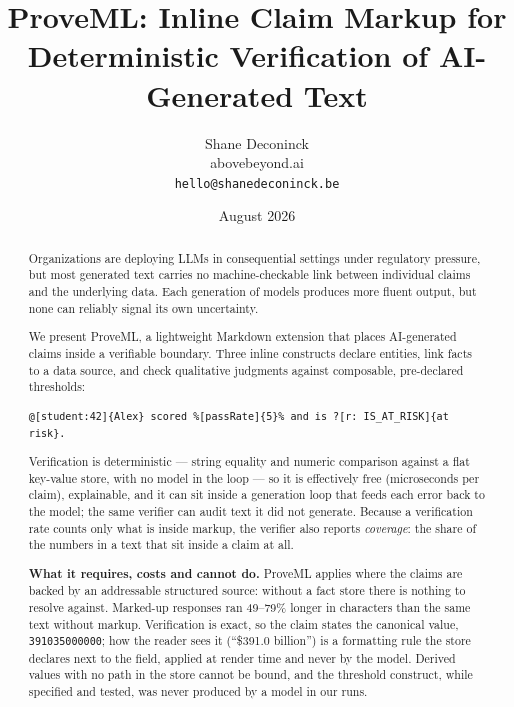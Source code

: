 \documentclass[11pt,a4paper]{article}
\title{\textbf{ProveML: Inline Claim Markup for Deterministic Verification of AI-Generated Text}}
\author{Shane Deconinck\\\small{abovebeyond.ai}\\\small{\texttt{hello@shanedeconinck.be}}}
\date{August 2026}
\begin{document}
\maketitle

\begin{abstract}
Organizations are deploying LLMs in consequential settings under regulatory pressure, but most generated text carries no machine-checkable link between individual claims and the underlying data. Each generation of models produces more fluent output, but none can reliably signal its own uncertainty.

\vspace{0.4em}
We present ProveML, a lightweight Markdown extension that places AI-generated claims inside a verifiable boundary. Three inline constructs declare entities, link facts to a data source, and check qualitative judgments against composable, pre-declared thresholds:

\vspace{0.3em}
{\footnotesize\texttt{@[student:42]\{Alex\} scored \%[passRate]\{5\}\% and is ?[r: IS\_AT\_RISK]\{at risk\}.}}

\vspace{0.3em}
\noindent Verification is deterministic --- string equality and numeric comparison against a flat key-value store, with no model in the loop --- so it is effectively free (microseconds per claim), explainable, and it can sit inside a generation loop that feeds each error back to the model; the same verifier can audit text it did not generate. Because a verification rate counts only what is inside markup, the verifier also reports \textit{coverage}: the share of the numbers in a text that sit inside a claim at all.

\vspace{0.4em}
\textbf{What it requires, costs and cannot do.} ProveML applies where the claims are backed by an addressable structured source: without a fact store there is nothing to resolve against. Marked-up responses ran 49--79\% longer in characters than the same text without markup. Verification is exact, so the claim states the canonical value, \texttt{391035000000}; how the reader sees it (``\$391.0 billion'') is a formatting rule the store declares next to the field, applied at render time and never by the model. Derived values with no path in the store cannot be bound, and the threshold construct, while specified and tested, was never produced by a model in our runs.


\end{abstract}
\end{document}
